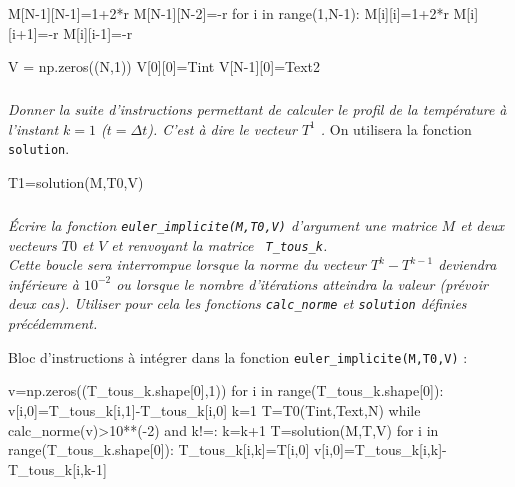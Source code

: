 \documentclass[10pt,fleqn]{article} %
\begin{document}
\begin{multicols}{2}
\begin{corrige}
\begin{python}
M[N-1][N-1]=1+2*r
M[N-1][N-2]=-r
for i in range(1,N-1):
    M[i][i]=1+2*r
    M[i][i+1]=-r
    M[i][i-1]=-r

V = np.zeros((N,1))
V[0][0]=Tint
V[N-1][0]=Text2
\end{python}
\end{corrige}

\else
\fi


\subparagraph{}
\textit{Donner la suite d'instructions permettant de calculer le profil de la température à 
l'instant $k=1$ ($t=\Delta t$). C'est à dire le vecteur $T^1$ .}
On utilisera la fonction  \texttt{solution}.%
\ifprof

\begin{corrige}
\begin{python}
T1=solution(M,T0,V)
\end{python}
\end{corrige}
\else
\fi


\subparagraph{}
\textit{Écrire la fonction \texttt{euler\_implicite(M,T0,V)} d'argument une matrice $M$ et 
deux vecteurs $T0$ et $V$ et renvoyant la matrice \texttt{ T\_tous\_k}.\\
Cette boucle sera interrompue lorsque la norme  du vecteur $T^k-T^{k-1}$ deviendra inférieure à $10^{-2}$ ou lorsque le nombre d'itérations atteindra la valeur  (prévoir deux cas). Utiliser pour cela les fonctions \texttt{calc\_norme} et \texttt{solution} définies précédemment.}
\ifprof


\begin{corrige}
Bloc d'instructions à intégrer dans la fonction \texttt{euler\_implicite(M,T0,V)} :
\begin{python}
v=np.zeros((T_tous_k.shape[0],1))
for i in range(T_tous_k.shape[0]):
    v[i,0]=T_tous_k[i,1]-T_tous_k[i,0]
k=1
T=T0(Tint,Text,N)
while calc_norme(v)>10**(-2) and k!=:
    k=k+1
    T=solution(M,T,V)
    for i in range(T_tous_k.shape[0]):
        T_tous_k[i,k]=T[i,0]
        v[i,0]=T_tous_k[i,k]-T_tous_k[i,k-1]
\end{python}        
\end{corrige}
\else
\fi




\end{multicols}
\end{document}
